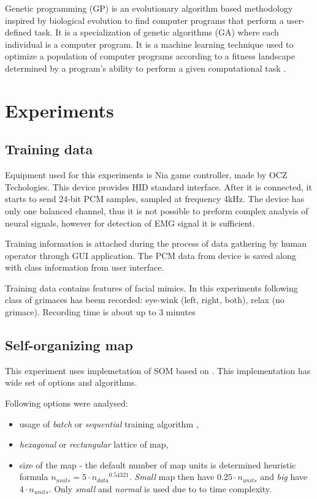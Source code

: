 \documentclass[a4paper,jurnal]{IEEEtran}
\begin{document}
Genetic programming (GP) is an evolutionary algorithm based methodology 
inspired by biological evolution to find computer programs that perform 
a user-defined task. 
It is a specialization of genetic algorithms (GA) where each 
individual is a computer program. 
It is a machine learning technique used to optimize a population of 
computer programs according to a fitness landscape determined by a 
program's ability to perform a given computational task \cite{gawiki}.


\section{Experiments}
\subsection{Training data} %
Equipment used for this experiments is {Nia game controller}, made by 
{OCZ Techologies}. This device provides HID standard interface.
After it is connected, it starts to send 24-bit PCM samples, 
sampled at frequency 4kHz. The device has only one balanced channel, thus 
it is not possible to preform complex analysis of neural signals,
however for detection of EMG signal it is sufficient.

Training information is attached during the process of data gathering by human operator 
through GUI application.
The PCM data from device is saved along with class information from
user interface.

Training data contains features of facial mimics. In this experiments
following class of grimaces has beem recorded: eye-wink (left, right, both), 
relax (no grimace).
Recording time is about up to 3 minutes

\subsection{Self-organizing map}
This experiment uses implemetation of SOM based on \cite{somtoolbox}.
This implementation has wide set of options and algorithms.

Following options were analysed:
\begin{itemize}
	\item usage of \textit{batch} or \textit{sequential} training algorithm 
	\cite{somtoolbox},
	\item \textit{hexagonal} or \textit{rectangular} lattice of map,
	\item size of the map - the default number of map units is determined heuristic formula 
	$ n_{units} = 5\cdot {n_{data}}^{0.54321} $. \textit{Small} map then
	have $ 0.25\cdot n_{units} $ and \textit{big} have $ 4\cdot n_{units} $. Only
	\textit{small} and \textit{normal} is used due to to time complexity.
\end{itemize}
\end{document}
